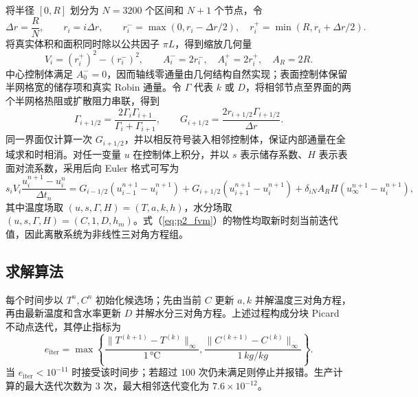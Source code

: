 \documentclass[withoutpreface,bwprint]{cumcmthesis}
\begin{document}
将半径 $[0,R]$ 划分为 $N=3200$ 个区间和 $N+1$ 个节点，令
\begin{equation}
\Delta r=\frac{R}{N},\qquad r_i=i\Delta r,\qquad
r_i^- =\max(0,r_i-\Delta r/2),\quad
r_i^+=\min(R,r_i+\Delta r/2).
\label{eq:p2_grid_geometry}
\end{equation}
将真实体积和面积同时除以公共因子 $\pi L$，得到缩放几何量
\begin{equation}
V_i=(r_i^+)^2-(r_i^-)^2,\qquad
A_i^-=2r_i^-,\quad A_i^+=2r_i^+,\quad A_R=2R.
\label{eq:p2_scaled_geometry}
\end{equation}
中心控制体满足 $A_0^-=0$，因而轴线零通量由几何结构自然实现；表面控制体保留半网格宽的储存项和真实 Robin 通量。令 $\Gamma$ 代表 $k$ 或 $D$，将相邻节点至界面的两个半网格热阻或扩散阻力串联，得到
\begin{equation}
\Gamma_{i+1/2}=\frac{2\Gamma_i\Gamma_{i+1}}{\Gamma_i+\Gamma_{i+1}},\qquad
G_{i+1/2}=\frac{2r_{i+1/2}\Gamma_{i+1/2}}{\Delta r}.
\label{eq:p2_harmonic_conductance}
\end{equation}
同一界面仅计算一次 $G_{i+1/2}$，并以相反符号装入相邻控制体，保证内部通量在全域求和时相消。对任一变量 $u$ 在控制体上积分，并以 $s$ 表示储存系数、$H$ 表示表面对流系数，采用后向 Euler 格式可写为
\begin{equation}
s_iV_i\frac{u_i^{n+1}-u_i^n}{\Delta t_n}
=G_{i-1/2}(u_{i-1}^{n+1}-u_i^{n+1})
+G_{i+1/2}(u_{i+1}^{n+1}-u_i^{n+1})
+\delta_{iN}A_RH(u_\infty^{n+1}-u_i^{n+1}),
\label{eq:p2_fvm}
\end{equation}
其中温度场取 $(u,s,\Gamma,H)=(T,a,k,h)$，水分场取 $(u,s,\Gamma,H)=(C,1,D,h_m)$。式（\ref{eq:p2_fvm}）的物性均取新时刻当前迭代值，因此离散系统为非线性三对角方程组。

\subsection{求解算法}

每个时间步以 $T^n,C^n$ 初始化候选场；先由当前 $C$ 更新 $a,k$ 并解温度三对角方程，再由最新温度和含水率更新 $D$ 并解水分三对角方程。上述过程构成分块 Picard 不动点迭代，其停止指标为
\begin{equation}
e_{\mathrm{iter}}=\max\left\{
\frac{\|T^{(k+1)}-T^{(k)}\|_\infty}{1\,\si{\celsius}},
\frac{\|C^{(k+1)}-C^{(k)}\|_\infty}{1\,\si{kg/kg}}
\right\}.
\label{eq:p2_picard_error}
\end{equation}
当 $e_{\mathrm{iter}}<10^{-11}$ 时接受该时间步；若超过 $100$ 次仍未满足则停止并报错。生产计算的最大迭代次数为 $3$ 次，最大相邻迭代变化为 $7.6\times10^{-12}$。
\end{document}
